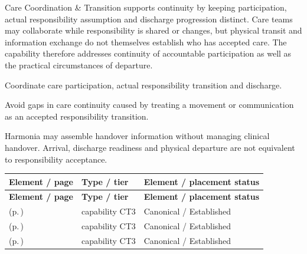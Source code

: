 Care Coordination \& Transition supports continuity by keeping participation, actual responsibility assumption and discharge progression distinct. Care teams may collaborate while responsibility is shared or changes, but physical transit and information exchange do not themselves establish who has accepted care. The capability therefore addresses continuity of accountable participation as well as the practical circumstances of departure.



Coordinate care participation, actual responsibility transition and discharge.



Avoid gaps in care continuity caused by treating a movement or communication as an accepted responsibility transition.



Harmonia may assemble handover information without managing clinical handover. Arrival, discharge readiness and physical departure are not equivalent to responsibility acceptance.


\begingroup\small\setlength{\TableWidth}{\dimexpr\linewidth-6\tabcolsep-4\arrayrulewidth\relax}
\begin{longtable}{|>{\raggedright\arraybackslash}p{0.52\TableWidth}|>{\raggedright\arraybackslash}p{0.2\TableWidth}|>{\raggedright\arraybackslash}p{0.28\TableWidth}|}
\hline\rowcolor{TableHead}\textbf{Element / page} & \textbf{Type / tier} & \textbf{Element / placement status}\\\hline\endfirsthead
\hline\rowcolor{TableHead}\textbf{Element / page} & \textbf{Type / tier} & \textbf{Element / placement status}\\\hline\endhead
\hline\endfoot
\nameref{cap:bc-care-team-coordination} (p.\,\pageref{cap:bc-care-team-coordination}) & capability CT3 & Canonical / Established\\\hline
\nameref{cap:bc-care-responsibility-transition} (p.\,\pageref{cap:bc-care-responsibility-transition}) & capability CT3 & Canonical / Established\\\hline
\nameref{cap:bc-care-discharge-coordination} (p.\,\pageref{cap:bc-care-discharge-coordination}) & capability CT3 & Canonical / Established\\\hline
\end{longtable}\endgroup

